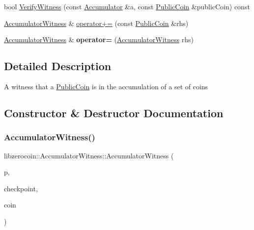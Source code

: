 \begin{DoxyCompactItemize}
\item 
bool \mbox{\hyperlink{classlibzerocoin_1_1_accumulator_witness_a76ce479fd510ed04d78c821cdb2a37bd}{Verify\+Witness}} (const \mbox{\hyperlink{classlibzerocoin_1_1_accumulator}{Accumulator}} \&a, const \mbox{\hyperlink{classlibzerocoin_1_1_public_coin}{Public\+Coin}} \&public\+Coin) const
\item 
\mbox{\hyperlink{classlibzerocoin_1_1_accumulator_witness}{Accumulator\+Witness}} \& \mbox{\hyperlink{classlibzerocoin_1_1_accumulator_witness_a57de1414fbb80e5259a76e70b4baa28e}{operator+=}} (const \mbox{\hyperlink{classlibzerocoin_1_1_public_coin}{Public\+Coin}} \&rhs)
\item 
\mbox{\label{classlibzerocoin_1_1_accumulator_witness_abf74598e2b7b1db65aaf0ad27d325daa}} 
\mbox{\hyperlink{classlibzerocoin_1_1_accumulator_witness}{Accumulator\+Witness}} \& {\bfseries operator=} (\mbox{\hyperlink{classlibzerocoin_1_1_accumulator_witness}{Accumulator\+Witness}} rhs)
\end{DoxyCompactItemize}


\subsection{Detailed Description}
A witness that a \mbox{\hyperlink{classlibzerocoin_1_1_public_coin}{Public\+Coin}} is in the accumulation of a set of coins 

\subsection{Constructor \& Destructor Documentation}
\mbox{\label{classlibzerocoin_1_1_accumulator_witness_af1abca6db569d151f4b416221f28d18e}} 
\subsubsection{\texorpdfstring{AccumulatorWitness()}{AccumulatorWitness()}}
{\footnotesize\ttfamily libzerocoin\+::\+Accumulator\+Witness\+::\+Accumulator\+Witness (\begin{DoxyParamCaption}\item[{const \mbox{\hyperlink{classlibzerocoin_1_1_zerocoin_params}{Zerocoin\+Params}} $\ast$}]{p,  }\item[{const \mbox{\hyperlink{classlibzerocoin_1_1_accumulator}{Accumulator}} \&}]{checkpoint,  }\item[{const \mbox{\hyperlink{classlibzerocoin_1_1_public_coin}{Public\+Coin}}}]{coin }\end{DoxyParamCaption})}

